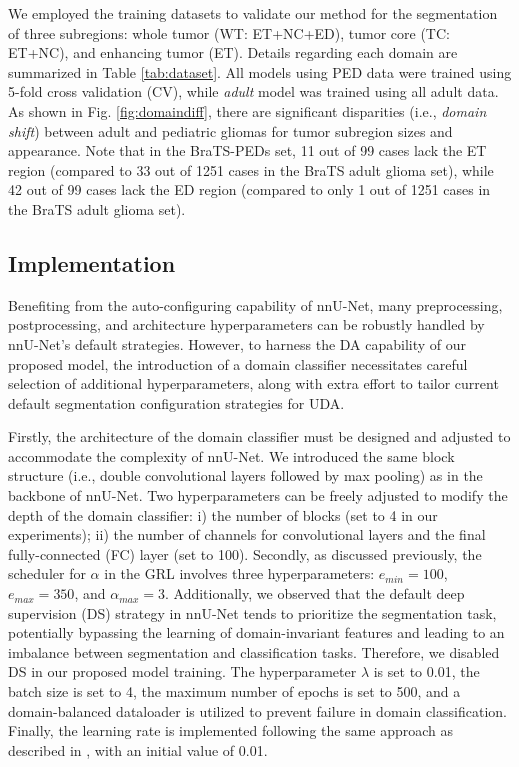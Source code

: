 \documentclass[runningheads]{llncs}
\begin{document}
We employed the training datasets to validate our method for the segmentation of three subregions: whole tumor (WT: ET+NC+ED), tumor core (TC: ET+NC), and enhancing tumor (ET). Details regarding each domain are summarized in Table \ref{tab:dataset}. All models using PED data were trained using 5-fold cross validation (CV), while \textit{adult} model was trained using all adult data. %
As shown in Fig. \ref{fig:domaindiff}, there are significant disparities (i.e., \textit{domain shift}) between adult and pediatric gliomas for tumor subregion sizes and appearance. Note that in the BraTS-PEDs set, 11 out of 99 cases lack the ET region (compared to 33 out of 1251 cases in the BraTS adult glioma set), while 42 out of 99 cases lack the ED region (compared to only 1 out of 1251 cases in the BraTS adult glioma set). 

\subsection{Implementation}
Benefiting from the auto-configuring capability of nnU-Net, many preprocessing, postprocessing, and architecture hyperparameters can be robustly handled by nnU-Net's default strategies. However, to harness the DA capability of our proposed model, the introduction of a domain classifier necessitates careful selection of additional hyperparameters, along with extra effort to tailor current default segmentation configuration strategies for UDA. 

Firstly, the architecture of the domain classifier must be designed and adjusted to accommodate the complexity of nnU-Net. We introduced the same block structure (i.e., double convolutional layers followed by max pooling) as in the backbone of nnU-Net. Two hyperparameters can be freely adjusted to modify the depth of the domain classifier: i) the number of blocks (set to 4 in our experiments); ii) the number of channels for convolutional layers and the final fully-connected (FC) layer (set to 100).
Secondly, as discussed previously, the scheduler for $\alpha$ in the GRL involves three hyperparameters: $e_{min} = 100$, $e_{max} = 350$, and $\alpha_{max}=3$. Additionally, we observed that the default deep supervision (DS) strategy in nnU-Net tends to prioritize the segmentation task, potentially bypassing the learning of domain-invariant features and leading to an imbalance between segmentation and classification tasks. Therefore, we disabled DS in our proposed model training.
The hyperparameter $\lambda$ is set to 0.01, the batch size is set to 4, the maximum number of epochs is set to 500, and a domain-balanced dataloader is utilized to prevent failure in domain classification. Finally, the learning rate is implemented following the same approach as described in \cite{ganin2016domain}, with an initial value of 0.01.%
\end{document}

